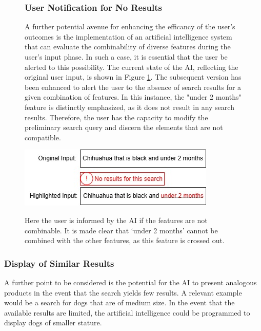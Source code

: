 \documentclass[../../submission.tex]{subfiles}
\begin{document}
 \begin{figure}[h]
    \centering
    \begin{minipage}{0.35\textwidth}
        \subsubsection{User Notification for No Results}
        A further potential avenue for enhancing the efficancy of the user's 
        outcomes is the implementation of an artificial intelligence system that can 
        evaluate the combinability of diverse features during the user's input phase. 
        In such a case, it is essential that the user be alerted to this possibility. 
        The current state of the AI, reflecting the original user input, is shown in Figure \ref{fig:no_result}. The subsequent version has been enhanced to alert the user to the 
        absence of search results for a given combination of features. In this instance, the 
        "under 2 months" feature is distinctly emphasized, as it does not result in any search results. 
        Therefore, the user has the capacity to modify the preliminary search query and discern the 
        elements that are not compatible.  
    \end{minipage}
    \hfill
    \begin{minipage}{0.55\textwidth}
        
        \includegraphics[width=\textwidth]{images/keine_ergebnisse}
        \caption{Here the user is informed by the AI if the features are not combinable. It is made clear that ‘under 2 months’ cannot be combined with the other features, as this feature is crossed out.}
        \Description{}
        \label{fig:no_result}
    \end{minipage}
\end{figure}

\subsubsection{Display of Similar Results}   

A further point to be considered is the potential for the AI to present analogous
 products in the event that the search yields few results. A relevant example  
 would be a search for dogs that are of medium size. In the event that the available 
 results are limited, the artificial intelligence could be programmed to display dogs of 
 smaller stature.
\end{document}
